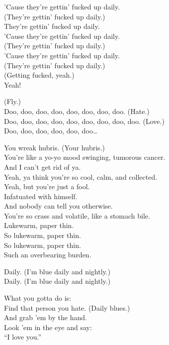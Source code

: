 
'Cause they're gettin' fucked up daily. \\
(They're gettin' fucked up daily.) \\
They're gettin' fucked up daily. \\
'Cause they're gettin' fucked up daily. \\
(They're gettin' fucked up daily.) \\
'Cause they're gettin' fucked up daily. \\
(They're gettin' fucked up daily.) \\
(Getting fucked, yeah.) \\
Yeah!

(Fly.) \\
Doo, doo, doo, doo, doo, doo, doo, doo. (Hate.) \\
Doo, doo, doo, doo, doo, doo, doo, doo, doo. (Love.) \\
Doo, doo, doo, doo, doo, doo… \\


You wreak hubris. (Your hubris.) \\
You're like a yo-yo mood swinging, tumorous cancer. \\
And I can't get rid of ya. \\
Yeah, ya think you're so cool, calm, and collected. \\
Yeah, but you're just a fool. \\

Infatuated with himself. \\
And nobody can tell you otherwise. \\
You're so crass and volatile, like a stomach bile. \\
Lukewarm, paper thin. \\
So lukewarm, paper thin. \\
So lukewarm, paper thin. \\
Such an overbearing burden. \\


Daily. (I'm blue daily and nightly.) \\
Daily. (I'm blue daily and nightly.) \\


What you gotta do is: \\
Find that person you hate. (Daily blues.) \\
And grab 'em by the hand. \\
Look 'em in the eye and say: \\
``I love you.'' \\

